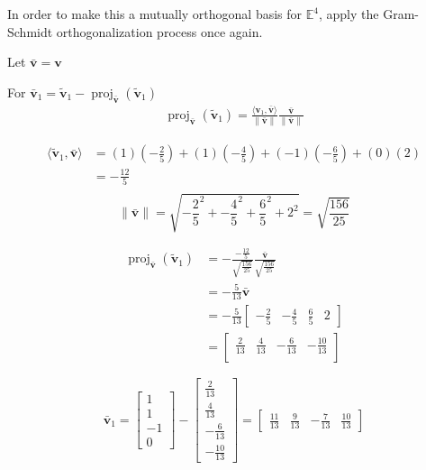 \documentclass{tufte-book}
\DeclareMathOperator{\proj}{proj}
\newcommand{\vct}{\mathbf}
\newcommand{\dprod}[2]{\langle #1, #2 \rangle}
\theoremstyle{mytheoremstyle}
\theoremstyle{mylemstyle}
\theoremstyle{mydefstyle}
\begin{document}
In order to make this a mutually orthogonal basis for $\mathbb{E}^4$, apply the Gram-Schmidt orthogonalization process once again.

Let $ \vct{\bar{v}} = \vct{v}$

For $\vct{\bar{v}}_1 = \vct{\tilde{v}}_1 - \proj_{\vct{\bar{v}}}(\vct{\tilde{v}}_1)$
\begin{align*}
\proj_{\vct{\bar{v}}}(\vct{\tilde{v}}_1) = \frac{\dprod{\vct{v}_1}{\vct{\bar{v}}}}{\|\vct{\bar{v}}\|}\frac{\vct{\bar{v}}}{\|\vct{\bar{v}}\|}
\end{align*}

\begin{align*}
\dprod{\vct{\tilde{v}}_1}{\vct{\bar{v}}} &= (1)(-\frac{2}{5}) + (1)(-\frac{4}{5}) + (-1)(-\frac{6}{5}) +(0)(2)\\
&=-\frac{12}{5} \\
\end{align*}
\[
\|\vct{\bar{v}}\| = \sqrt{-\frac{2}{5}^2 + -\frac{4}{5}^2 + \frac{6}{5}^2 + 2^2}
= \sqrt{\frac{156}{25}}
\]


\begin{align*}
\proj_{\vct{\bar{v}}}(\vct{\tilde{v}}_1) &= -\frac{-\frac{12}{5}}{\sqrt{\frac{156}{25}}}\frac{\vct{\bar{v}}}{\sqrt{\frac{156}{25}}}\\
&= -\frac{5}{13}\vct{\bar{v}}\\
&= -\frac{5}{13}
\begin{bmatrix}
-\frac{2}{5} & -\frac{4}{5} & \frac{6}{5} & 2
\end{bmatrix}\\
&= \begin{bmatrix}
\frac{2}{13} & \frac{4}{13} & -\frac{6}{13} & -\frac{10}{13} \\
\end{bmatrix}
\end{align*}

\[
\vct{\bar{v}}_1 = 
\begin{bmatrix}
1 \\
1 \\
-1 \\ 
0
\end{bmatrix} -
\begin{bmatrix}
\frac{2}{13}  \\
\frac{4}{13} \\ 
-\frac{6}{13}\\
-\frac{10}{13}
\end{bmatrix}
=
\begin{bmatrix}
\frac{11}{13} & \frac{9}{13} &-\frac{7}{13} & \frac{10}{13}
\end{bmatrix}
\]
\end{document}
